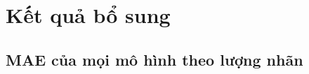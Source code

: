 \chapter{Kết quả bổ sung}
\label{app:additional}

\section{MAE của mọi mô hình theo lượng nhãn}\label{sec:bigtab}




